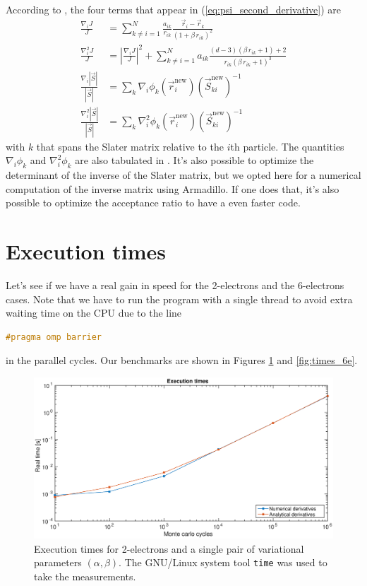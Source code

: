 \documentclass[a4paper,twoside,11pt]{book}
\begin{document}
According to \cite{jorgen}, the four terms that appear in (\ref{eq:psi_second_derivative}) are
\begin{align}
	\frac{\nabla_i J}{J} 
	&= \sum_{k \neq i=1}^N \frac{a_{ik}}{r_{ik}} \frac{\vec{r}_i-\vec{r}_k}{(1+\beta \, r_{ik})^2} \\
	\frac{\nabla_i^2 J}{J} 
	&= \left|\frac{\nabla_i J}{J} \right|^2+ \sum_{k \neq i=1}^N a_{ik} \frac{(d-3)(\beta \, r_{ik}+1)+2}{r_{ik}(\beta \, r_{ik}+1)^3} \\
	\frac{\nabla_i |\vec{S}|}{|\vec{S}|} 
	&= \sum_k \nabla_i \phi_k (\vec{r}_i^{\text{new}})(\vec{S}_{ki}^{\text{new}})^{-1} \\
	\frac{\nabla_i^2 |\vec{S}|}{|\vec{S}|} 
	&= \sum_k \nabla_i^2 \phi_k (\vec{r}_i^{\text{new}})(\vec{S}_{ki}^{\text{new}})^{-1}
\end{align}
with $k$ that spans the Slater matrix relative to the $i$th particle. The quantities $\nabla_i \phi_k$ and $\nabla^2_i \phi_k$ are also tabulated in \cite{jorgen}. It's also possible to optimize the determinant of the inverse of the Slater matrix, but we opted here for a numerical computation of the inverse matrix using Armadillo. If one does that, it's also possible to optimize the acceptance ratio to have a even faster code.

\section{Execution times}

Let's see if we have a real gain in speed for the 2-electrons and the 6-electrons cases. Note that we have to run the program with a single thread to avoid extra waiting time on the CPU due to the line
\begin{lstlisting}[language=cpp]
		#pragma omp barrier
\end{lstlisting}
in the parallel cycles. Our benchmarks are shown in Figures \ref{fig:times_2e} and \ref{fig:times_6e}.

\begin{figure}[H]
	\centering
	\includegraphics[width=\textwidth]{times_2e}
	\caption{Execution times for 2-electrons and a single pair of variational parameters $(\alpha,\beta)$. The GNU/Linux system tool \texttt{time} was used to take the measurements.}
	\label{fig:times_2e}
\end{figure}
\end{document}
